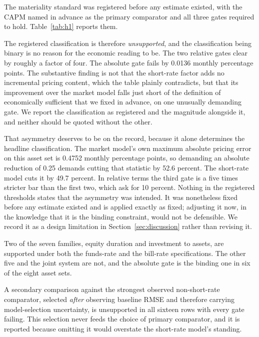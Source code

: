 \documentclass[11pt]{article}
\begin{document}
The materiality standard was registered before any estimate existed, with the
CAPM named in advance as the primary comparator and all three gates required to
hold. Table~\ref{tab:h1} reports them.



The registered classification is therefore \emph{unsupported}, and the
classification being binary is no reason for the economic reading to be. The two
relative gates clear by roughly a factor of four. The absolute gate fails by
0.0136 monthly percentage points. The substantive finding is not that the %
short-rate factor adds no incremental pricing content, which the table plainly
contradicts, but that its improvement over the market model falls just short of
the definition of economically sufficient that we fixed in advance, on one
unusually demanding gate. We report the classification as registered and the
magnitude alongside it, and neither should be quoted without the other.

That asymmetry deserves to be on the record, because it alone determines the
headline classification. The market model's own maximum absolute pricing error on
this asset set is 0.4752 monthly percentage points, so demanding an absolute %
reduction of 0.25 demands cutting that statistic by 52.6 percent. The short-rate %
model cuts it by 49.7 percent. In relative terms the third gate is a five times %
stricter bar than the first two, which ask for 10 percent. %
Nothing in the registered thresholds states that the asymmetry was intended. It
was nonetheless fixed before any estimate existed and is applied exactly as
fixed; adjusting it now, in the knowledge that it is the binding constraint,
would not be defensible. We record it as a design limitation in
Section~\ref{sec:discussion} rather than revising it.

Two of the seven families, equity duration and investment to assets, are
supported under both the funds-rate and the bill-rate specifications. The other
five and the joint system are not, and the absolute gate is the binding one in
six of the eight asset sets. %

A secondary comparison against the strongest observed non-short-rate comparator,
selected \emph{after} observing baseline RMSE and therefore carrying
model-selection uncertainty, is unsupported in all sixteen rows with every gate
failing. This selection never feeds the choice of primary comparator, and it is
reported because omitting it would overstate the short-rate model's standing. %
\end{document}
